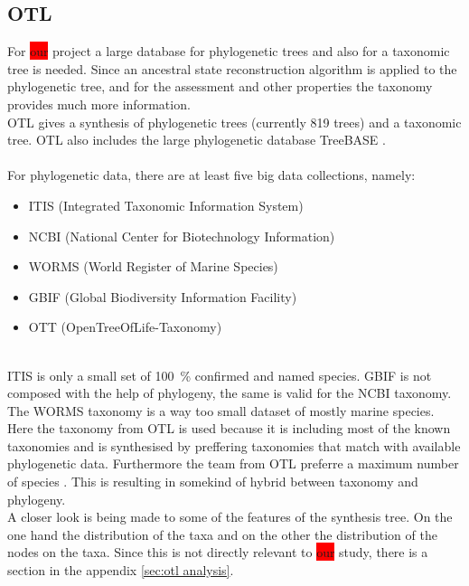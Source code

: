     \subsection{OTL}
      For \colorbox{red}{our} project a large database for phylogenetic trees and also for a taxonomic 
        tree is needed. Since an ancestral state reconstruction algorithm is applied to the phylogenetic 
        tree, and for the assessment and other properties the taxonomy provides much more information. \\
      OTL gives a synthesis of phylogenetic trees (currently 819 trees) and a taxonomic tree. OTL also 
        includes the large phylogenetic database TreeBASE \cite{Hinchliff2015}. \\
       \\
      For phylogenetic data, there are at least five big data collections, namely:
      \begin{itemize}
        \item ITIS (Integrated Taxonomic Information System) \cite{ITIS}
        \item NCBI (National Center for Biotechnology Information) \cite{NCBI1988}
        \item WORMS (World Register of Marine Species) \cite{WoRMS2018}
        \item GBIF (Global Biodiversity Information Facility) \cite{GBIF}
        \item OTT (OpenTreeOfLife-Taxonomy) \cite{Hinchliff2015}
      \end{itemize}
       \\
      ITIS is only a small set of 100~\% confirmed and named species. GBIF is not composed with the help 
        of phylogeny, the same is valid for the NCBI taxonomy. The WORMS taxonomy is a way too small 
        dataset of mostly marine species. \\
      Here the taxonomy from OTL is used because it is including most of the known taxonomies and is 
        synthesised by preffering taxonomies that match with available phylogenetic data. Furthermore 
        the team from OTL preferre a maximum number of species \cite{Hinchliff2015}. This is resulting 
        in somekind of hybrid between taxonomy and phylogeny.  \\

      A closer look is being made to some of the features of the synthesis tree. On the one hand the 
        distribution of the taxa and on the other the distribution of the nodes on the taxa. Since this 
        is not directly relevant to \colorbox{red}{our} study, there is a section in the appendix 
        \ref{sec:otl analysis}.

